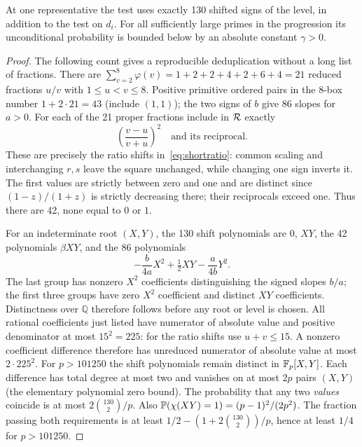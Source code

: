 \begin{lemma}\label{lem:signs}
At one representative the test uses exactly 130 shifted signs of the level, in addition to the test on $d_i$. For all sufficiently large primes in the progression its unconditional probability is bounded below by an absolute constant $\gamma>0$.
\end{lemma}
\begin{proof}
The following count gives a reproducible deduplication without a long list of fractions. There are $\sum_{v=2}^8\varphi(v)=1+2+2+4+2+6+4=21$ reduced fractions $u/v$ with $1\le u<v\le8$. Positive primitive ordered pairs in the $8$-box number $1+2\cdot21=43$ (include $(1,1)$); the two signs of $b$ give 86 slopes for $a>0$. For each of the 21 proper fractions include in $\mathcal R$ exactly
\[
 \left(\frac{v-u}{v+u}\right)^2\quad\text{and its reciprocal}.
\]
These are precisely the ratio shifts in~\eqref{eq:shortratio}: common scaling and interchanging $r,s$ leave the square unchanged, while changing one sign inverts it. The first values are strictly between zero and one and are distinct since $(1-z)/(1+z)$ is strictly decreasing there; their reciprocals exceed one. Thus there are 42, none equal to $0$ or $1$.

For an indeterminate root $(X,Y)$, the 130 shift polynomials are $0$, $XY$, the 42 polynomials $\beta XY$, and the 86 polynomials
\[
 -\frac{b}{4a}X^2+\tfrac12 XY-\frac{a}{4b}Y^2.
\]
The last group has nonzero $X^2$ coefficients distinguishing the signed slopes $b/a$; the first three groups have zero $X^2$ coefficient and distinct $XY$ coefficients. Distinctness over $\mathbb Q$ therefore follows before any root or level is chosen. All rational coefficients just listed have numerator of absolute value and positive denominator at most $15^2=225$: for the ratio shifts use $u+v\le15$. A nonzero coefficient difference therefore has unreduced numerator of absolute value at most $2\cdot225^2$. For $p>101250$ the shift polynomials remain distinct in $\mathbb F_p[X,Y]$. Each difference has total degree at most two and vanishes on at most $2p$ pairs $(X,Y)$ (the elementary polynomial zero bound). The probability that any two \emph{values} coincide is at most $2\binom{130}{2}/p$. Also $\mathbb P(\chi(XY)=1)=(p-1)^2/(2p^2)$. The fraction passing both requirements is at least $1/2-(1+2\binom{130}{2})/p$, hence at least $1/4$ for $p>101250$.


\end{proof}
